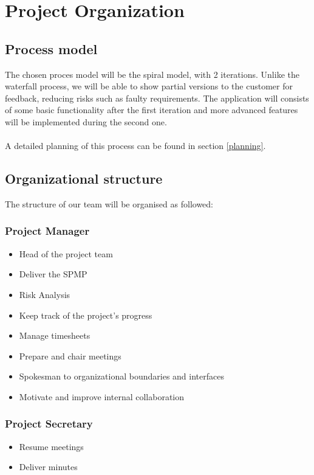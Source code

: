 \documentclass[a4paper, 12pt]{report}
\begin{document}
		
		
	\chapter{Project Organization}
	
		\section{Process model}
		
		The chosen proces model will be the spiral model, with 2 iterations. Unlike
		the waterfall process, we will be able to show partial versions to the customer 
		for feedback, reducing risks such as faulty requirements. The application will 
		consists of some basic functionality after the first iteration and more advanced features will be implemented 
		during the second one. \\
		\\
		A detailed planning of this process can be found in section \ref{planning}.
			
		
		\section{Organizational structure}
		\label{sec:struc}
		
		The structure of our team will be organised as followed:
		
		\subsection{Project Manager}
			\begin{itemize}
				\item Head of the project team
				\item Deliver the SPMP
				\item Risk Analysis
				\item Keep track of the project's progress
				\item Manage timesheets
				\item Prepare and chair meetings
				\item Spokesman to organizational boundaries and interfaces
				\item Motivate and improve internal collaboration
			\end{itemize}
			
		\subsection{Project Secretary}
			\begin{itemize}
				\item Resume meetings
				\item Deliver minutes
			\end{itemize}
			
\end{document}
